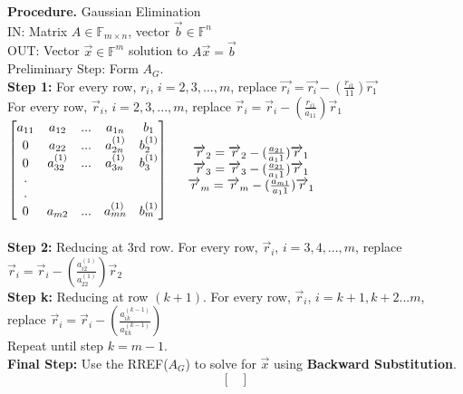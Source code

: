 \documentclass [12pt]{article}
\begin{document}
\begin{framed}
\noindent\textbf{Procedure. }Gaussian Elimination\\
IN: Matrix $A\in\mathbb{F}_{m\times n}$, vector $\overrightarrow{b}\in\mathbb{F}^n$\\
OUT: Vector $\overrightarrow{x}\in\mathbb{F}^m$ solution to $A\overrightarrow{x}=\overrightarrow{b}$\\
Preliminary Step: Form $A_G$.\\
\textbf{Step 1:} For every row, $r_i$, $i=2,3,...,m$, replace $\overrightarrow{r_i}=\overrightarrow{r_i}-(\frac{r_{i1}}{11})\overrightarrow{r_1}$\\
For every row, $\overrightarrow{r}_i$, $i=2,3,...,m$, replace $\overrightarrow{r}_i=\overrightarrow{r}_i-(\frac{r_{i1}}{a_11})\overrightarrow{r}_1$\\
$\begin{bmatrix}
a_{11}&a_{12}&...&a_{1n}&b_1\\
0&a_{22}&...&a_{2n}^{(1)}&b_2^{(1)}\\
0&a_{32}^{(1)}&...&a_{3n}^{(1)}&b_3^{(1)}\\
.\\
.\\
0&a_{m2}&...&a_{mn}^{(1)}&b_m^{(1)}
\end{bmatrix}\indent\begin{matrix} \overrightarrow{r}_2=\overrightarrow{r}_2-(\frac{a_{21}}{a_11})\overrightarrow{r}_1\\
\overrightarrow{r}_3=\overrightarrow{r}_3-(\frac{a_{21}}{a_11})\overrightarrow{r}_1\\
\overrightarrow{r}_m=\overrightarrow{r}_m-(\frac{a_{m1}}{a_11})\overrightarrow{r}_1
\end{matrix}$\\\\
\textbf{Step 2:} Reducing at 3rd row. For every row, $\overrightarrow{r}_i$, $i=3,4,...,m$, replace $\overrightarrow{r}_i=\overrightarrow{r}_i-(\frac{a_{i2}^{(1)}}{a_{22}^{(1)}})\overrightarrow{r}_2$\\
\textbf{Step k:} Reducing at row $(k+1)$. For every row, $\overrightarrow{r}_i$, $i=k+1,k+2...m$, replace $\overrightarrow{r}_i=\overrightarrow{r}_i-(\frac{a_{ik}^{(k-1)}}{a_{kk}^{(k-1)}})$\\
Repeat until step $k=m-1$.\\
\textbf{Final Step:} Use the RREF($A_G$) to solve for $\overrightarrow{x}$ using \textbf{Backward Substitution}.\\
$$\begin{bmatrix}

\end{bmatrix}$$
\end{framed}
\end{document}

